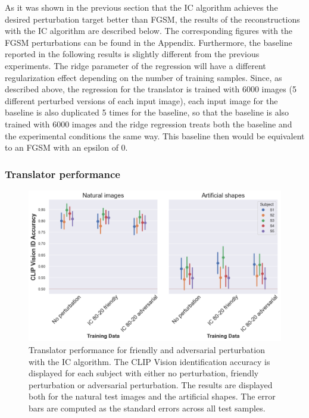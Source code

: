 As it was shown in the previous section that the IC algorithm achieves the desired perturbation target better than FGSM, the results of the reconstructions with the IC algorithm are described below. The corresponding figures with the FGSM perturbations can be found in the Appendix. Furthermore, the baseline reported in the following results is slightly different from the previous experiments. The ridge parameter of the regression will have a different regularization effect depending on the number of training samples. Since, as described above, the regression for the translator is trained with 6000 images (5 different perturbed versions of each input image), each input image for the baseline is also duplicated 5 times for the baseline, so that the baseline is also trained with 6000 images and the ridge regression treats both the baseline and the experimental conditions the same way. This baseline then would be equivalent to an FGSM with an epsilon of 0. 

\subsubsection{Translator performance}

\begin{figure}[ht]
    \centering
    \includegraphics[width=1\textwidth]{plots/advpert_translator_ic_80-20.png}
    \caption[Experiment 3: Translator performance]{Translator performance for friendly and adversarial perturbation with the IC algorithm. The CLIP Vision identification accuracy is displayed for each subject with either no perturbation, friendly perturbation or adversarial perturbation. The results are displayed both for the natural test images and the artificial shapes. The error bars are computed as the standard errors across all test samples.}\label{fig:advpert_translator_ic_80}
\end{figure}

